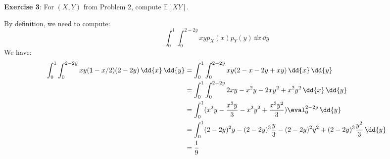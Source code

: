 \documentclass{article}
\begin{document}
\textbf{Exercise 3}: For $(X, Y)$ from Problem $2$, compute $\mathbb{E}[XY]$.
    \begin{answer}
        By definition, we need to compute:
            \begin{equation*}
                \int_{0}^{1} \int_{0}^{2 - 2y} xyp_{X}(x)p_{Y}(y) \, \dd{x}  \, \dd{y} 
            \end{equation*}
        We have:
            \begin{align*}
                \int_{0}^{1} \int_{0}^{2 - 2y} xy(1 - x/2)(2 - 2y) \, \dd{x}  \, \dd{y} &= \int_{0}^{1} \int_{0}^{2 - 2y} xy(2 - x - 2y + xy) \, \dd{x}  \, \dd{y}  \\
                &= \int_{0}^{1} \int_{0}^{2 - 2y} 2xy - x^{2}y - 2xy^{2} + x^{2}y^{2} \, \dd{x}  \, \dd{y}  \\
                &= \int_{0}^{1} (x^{2}y - \dfrac{x^{3}y}{3} - x^{2}y^{2} + \dfrac{x^{3}y^{2}}{3})\eval_{0}^{2 - 2y} \, \dd{y} \\
                &= \int_{0}^{1} (2 - 2y)^{2}y - (2 - 2y)^{3}\dfrac{y}{3} - (2 - 2y)^{2}y^{2} + (2 - 2y)^{3}\dfrac{y^{2}}{3} \, \dd{y} \\
                &= \dfrac{1}{9}
            \end{align*}
    \end{answer}

\newpage
\end{document}
